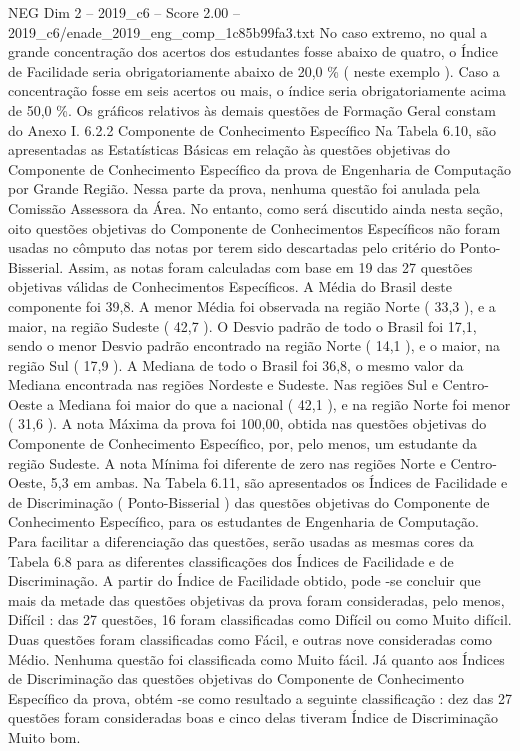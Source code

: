 \begin{textsample}{NEG Dim 2 – 2019\_c6 – Score 2.00 – 2019\_c6/enade\_2019\_eng\_comp\_1c85b99fa3.txt}
No caso extremo, no qual a grande concentração dos acertos dos estudantes fosse abaixo de quatro, o Índice de Facilidade seria obrigatoriamente abaixo de 20,0 \% ( neste exemplo ).
Caso a concentração fosse em seis acertos ou mais, o índice seria obrigatoriamente acima de 50,0 \%.
Os gráficos relativos às demais questões de Formação Geral constam do Anexo I. 6.2.2 Componente de Conhecimento Específico Na Tabela 6.10, são apresentadas as Estatísticas Básicas em relação às questões objetivas do Componente de Conhecimento Específico da prova de Engenharia de Computação por Grande Região.
Nessa parte da prova, nenhuma questão foi anulada pela Comissão Assessora da Área.
No entanto, como será discutido ainda nesta seção, oito questões objetivas do Componente de Conhecimentos Específicos não foram usadas no cômputo das notas por terem sido descartadas pelo critério do Ponto-Bisserial.
Assim, as notas foram calculadas com base em 19 das 27 questões objetivas válidas de Conhecimentos Específicos.
A Média do Brasil deste componente foi 39,8.
A menor Média foi observada na região Norte ( 33,3 ), e a maior, na região Sudeste ( 42,7 ).
O Desvio padrão de todo o Brasil foi 17,1, sendo o menor Desvio padrão encontrado na região Norte ( 14,1 ), e o maior, na região Sul ( 17,9 ).
A Mediana de todo o Brasil foi 36,8, o mesmo valor da Mediana encontrada nas regiões Nordeste e Sudeste.
Nas regiões Sul e Centro-Oeste a Mediana foi maior do que a nacional ( 42,1 ), e na região Norte foi menor ( 31,6 ).
A nota Máxima da prova foi 100,00, obtida nas questões objetivas do Componente de Conhecimento Específico, por, pelo menos, um estudante da região Sudeste.
A nota Mínima foi diferente de zero nas regiões Norte e Centro-Oeste, 5,3 em ambas.
Na Tabela 6.11, são apresentados os Índices de Facilidade e de Discriminação ( Ponto-Bisserial ) das questões objetivas do Componente de Conhecimento Específico, para os estudantes de Engenharia de Computação.
Para facilitar a diferenciação das questões, serão usadas as mesmas cores da Tabela 6.8 para as diferentes classificações dos Índices de Facilidade e de Discriminação.
A partir do Índice de Facilidade obtido, pode -se concluir que mais da metade das questões objetivas da prova foram consideradas, pelo menos, Difícil : das 27 questões, 16 foram classificadas como Difícil ou como Muito difícil.
Duas questões foram classificadas como Fácil, e outras nove consideradas como Médio.
Nenhuma questão foi classificada como Muito fácil.
Já quanto aos Índices de Discriminação das questões objetivas do Componente de Conhecimento Específico da prova, obtém -se como resultado a seguinte classificação : dez das 27 questões foram consideradas boas e cinco delas tiveram Índice de Discriminação Muito bom.

\end{textsample}
